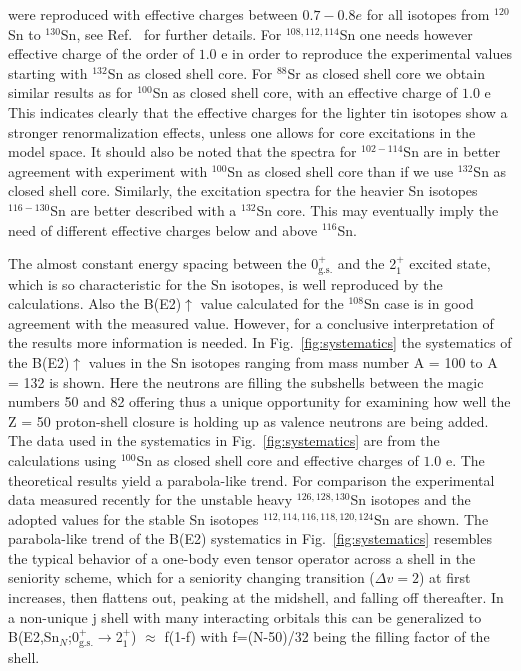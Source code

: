 \documentclass[aps,prc,twocolumn,amssymb,showpacs]{revtex4}
\begin{document}
were reproduced with effective charges between $0.7-0.8 e$ for all 
isotopes from  $^{120}$Sn to $^{130}$Sn,
see Ref.~\cite{hol98} for further details.
For $^{108,112, 114}$Sn one needs however effective charge of the order
of $1.0$ e in order to reproduce the experimental values starting with 
$^{132}$Sn as closed shell core. For  $^{88}$Sr as closed shell core 
we obtain similar results as for $^{100}$Sn as closed shell core, with an 
effective charge of $1.0$ e
This indicates clearly that the effective charges  for the lighter tin isotopes show
a stronger renormalization effects, unless one allows
for core excitations in the model space.  It should also be noted that the spectra
for $^{102-114}$Sn are in better agreement with experiment with $^{100}$Sn
as closed shell core than if we use $^{132}$Sn as closed shell core.
Similarly, the excitation spectra for the heavier Sn isotopes 
$^{116-130}$Sn are better described with a $^{132}$Sn core.
This may eventually imply the need of different effective charges below and
above $^{116}$Sn.

The almost constant energy spacing between the 0$^+_{\text{g.s.}}$
and the 2$^{+}_{1}$ excited state, which is so characteristic for
the Sn isotopes, is well reproduced by the calculations. Also the
B(E2)$\uparrow$ value calculated for the $^{108}$Sn case is in
good agreement with the measured value. However, for a conclusive
interpretation of the results more information is needed. In
Fig.~\ref{fig:systematics} the systematics of the B(E2)$\uparrow$
values in the Sn isotopes ranging from mass number A = 100 to A =
132 is shown. Here the neutrons are filling the subshells between
the magic numbers 50 and 82 offering thus a unique opportunity for
examining how well the Z = 50 proton-shell closure is holding up
as valence neutrons are being added. The data used in the
systematics in Fig.~\ref{fig:systematics} are from the calculations using
$^{100}$Sn as closed shell core and effective charges of $1.0$ e. 
The theoretical results yield a parabola-like trend.
For comparison the experimental data measured recently for the
unstable heavy $^{126,128,130}$Sn isotopes \cite{rad04} and the
adopted values for the stable Sn isotopes $^{112, 114, 116, 118,
120, 124}$Sn \cite{ram01} are shown. The parabola-like trend of
the B(E2) systematics in Fig.~\ref{fig:systematics} resembles the
typical behavior of a one-body even tensor operator across a shell
in the seniority scheme, which for a seniority changing transition
($\Delta v = 2$) at first increases, then flattens out, peaking at
the midshell, and falling off thereafter. In a non-unique j shell
with many interacting orbitals this can be generalized to
B(E2,Sn$_N$;0$^{+}_{\text{g.s.}}$$\rightarrow$2$^{+}_{1}$)
$\approx$ f(1-f) with f=(N-50)/32 being the filling factor of the
shell.
\end{document}
